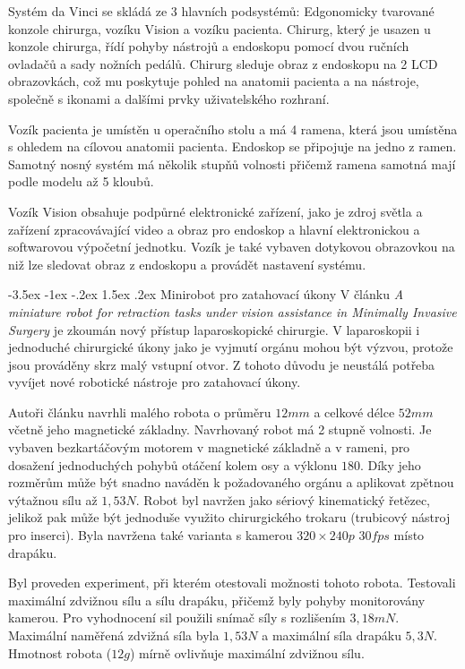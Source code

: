 \documentclass[10pt, a4paper]{article}
\makeatletter
\theoremstyle{definition}
\renewcommand\subsection{\@startsection {subsection}{1}{\z@}%
                                   {-3.5ex \@plus -1ex \@minus -.2ex}%
                                   {1.5ex \@plus.2ex}%
                                   {\normalsize\bfseries}}
\makeatother
\begin{document}
Systém da Vinci se skládá ze 3 hlavních podsystémů:
Edgonomicky tvarované konzole chirurga, vozíku Vision a vozíku pacienta.
Chirurg, který je usazen u konzole chirurga, řídí
pohyby nástrojů a endoskopu pomocí dvou ručních ovladačů
a sady nožních pedálů. Chirurg sleduje obraz z endoskopu na 2 LCD obrazovkách,
což mu poskytuje pohled na anatomii pacienta a na nástroje, společně s ikonami
a dalšími prvky uživatelského rozhraní.

Vozík pacienta je umístěn u operačního stolu a má 4 ramena, která jsou
umístěna s ohledem na cílovou anatomii pacienta.
Endoskop se připojuje na jedno z ramen. Samotný nosný systém má
několik stupňů volnosti přičemž ramena samotná mají podle modelu až 5 kloubů.

Vozík Vision obsahuje podpůrné elektronické zařízení, jako je zdroj světla
a zařízení zpracovávající video a obraz pro endoskop a hlavní elektronickou
a softwarovou výpočetní jednotku. Vozík je také vybaven
dotykovou obrazovkou na niž lze sledovat obraz z endoskopu a provádět
nastavení systému.
\cite{da_Vinci_handbook}


\subsection{Minirobot pro zatahovací úkony}
\label{subsec:minirobot}\label{}
V článku \textit{A miniature robot for retraction tasks under vision assistance in Minimally Invasive Surgery} \cite{minirobot}
je zkoumán nový přístup laparoskopické chirurgie.
V laparoskopii i jednoduché chirurgické úkony jako je vyjmutí orgánu
mohou být výzvou, protože jsou prováděny skrz malý vstupní otvor.
Z tohoto důvodu je neustálá potřeba vyvíjet nové robotické nástroje
pro zatahovací úkony.

Autoři článku navrhli malého robota o průměru $12mm$ a celkové délce $52mm$
včetně jeho magnetické základny. Navrhovaný robot má 2 stupně volnosti.
Je vybaven bezkartáčovým motorem v magnetické základně a v rameni, 
pro dosažení jednoduchých pohybů otáčení kolem osy a výklonu $180$\textdegree. 
Díky jeho rozměrům může být snadno naváděn k
požadovaného orgánu a aplikovat zpětnou výtažnou sílu až $1,53N$.
Robot byl navržen jako sériový kinematický řetězec,
jelikož pak může být jednoduše využito
chirurgického trokaru (trubicový nástroj pro inserci).
Byla navržena také varianta s kamerou $320\times240p$ $30fps$ místo drapáku.

Byl proveden experiment, při kterém otestovali možnosti tohoto robota.
Testovali maximální zdvižnou sílu a sílu drapáku, přičemž byly
pohyby monitorovány kamerou.
Pro vyhodnocení sil použili snímač síly s rozlišením $3,18mN$.
Maximální naměřená zdvižná síla byla $1,53N$ a maximální síla drapáku $5,3N$.
Hmotnost robota ($12g$) mírně ovlivňuje maximální zdvižnou sílu.
\end{document}
